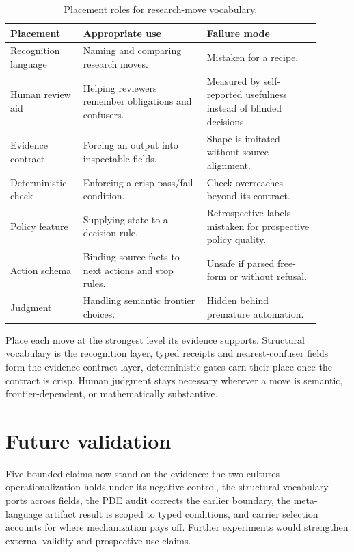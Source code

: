 \documentclass[11pt]{article}
\begin{document}
\begin{table}[ht]
\centering
\caption{Placement roles for research-move vocabulary.}
\label{tab:placement}
\begin{tabular}{p{0.21\linewidth}p{0.36\linewidth}p{0.33\linewidth}}
\toprule
Placement & Appropriate use & Failure mode \\
\midrule
Recognition language & Naming and comparing research moves. & Mistaken for a recipe. \\
Human review aid & Helping reviewers remember obligations and confusers. & Measured by self-reported usefulness instead of blinded decisions. \\
Evidence contract & Forcing an output into inspectable fields. & Shape is imitated without source alignment. \\
Deterministic check & Enforcing a crisp pass/fail condition. & Check overreaches beyond its contract. \\
Policy feature & Supplying state to a decision rule. & Retrospective labels mistaken for prospective policy quality. \\
Action schema & Binding source facts to next actions and stop rules. & Unsafe if parsed free-form or without refusal. \\
Judgment & Handling semantic frontier choices. & Hidden behind premature automation. \\
\bottomrule
\end{tabular}
\end{table}

Place each move at the strongest level its evidence supports. Structural
vocabulary is the recognition layer, typed receipts and nearest-confuser fields
form the evidence-contract layer, deterministic gates earn their place once the
contract is crisp. Human judgment stays necessary wherever a move is semantic,
frontier-dependent, or mathematically substantive.

\section{Future validation}

Five bounded claims now stand on the evidence: the two-cultures
operationalization holds under its negative control, the structural vocabulary
ports across fields, the PDE audit corrects the earlier boundary, the
meta-language artifact result is scoped to typed conditions, and carrier
selection accounts for where mechanization pays off. Further experiments would
strengthen external validity and prospective-use claims.
\end{document}
